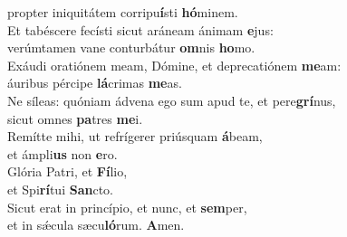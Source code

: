 \evenverse propter iniquitátem corripu\textbf{í}sti \textbf{hó}minem.\\
\oddverse Et tabéscere fecísti sicut aráneam ánimam \textbf{e}jus:~\*\\
\oddverse verúmtamen vane conturbátur \textbf{om}nis \textbf{ho}mo.\\
\evenverse Exáudi oratiónem meam, Dómine, et deprecatiónem \textbf{me}am:~\*\\
\evenverse áuribus pércipe \textbf{lá}crimas \textbf{me}as.\\
\oddverse Ne síleas: quóniam ádvena ego sum apud te, et pere\textbf{grí}nus,~\*\\
\oddverse sicut omnes \textbf{pa}tres \textbf{me}i.\\
\evenverse Remítte mihi, ut refrígerer priúsquam \textbf{á}beam,~\*\\
\evenverse et ámpli\textbf{us} non \textbf{e}ro.\\
\oddverse Glória Patri, et \textbf{Fí}lio,~\*\\
\oddverse et Spi\textbf{rí}tui \textbf{San}cto.\\
\evenverse Sicut erat in princípio, et nunc, et \textbf{sem}per,~\*\\
\evenverse et in sǽcula sæcu\textbf{ló}rum. \textbf{A}men.\\
